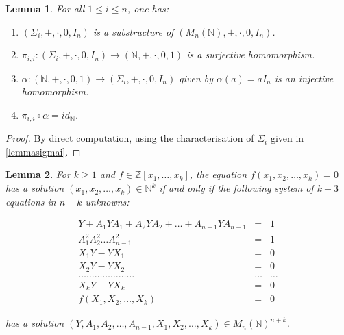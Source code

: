 \documentclass{article}
\theoremstyle{plain}
\newtheorem{lemma}{Lemma}[section]
\theoremstyle{definition}
\begin{document}
\begin{lemma}\label{lemmahomomorphism} For all $1 \leq i \leq n$, one has:
\begin{enumerate}
\item $(\Sigma_i, +, \cdot, 0, I_n)$ is a substructure of $(M_n(\mathbb N), +, \cdot, 0, I_n)$.  
\item $\pi_{i,i} : (\Sigma_i, +, \cdot, 0, I_n) \rightarrow (\mathbb N, +, \cdot, 0, 1)$ is a surjective homomorphism. 
\item $\alpha :  (\mathbb N, +, \cdot, 0, 1) \rightarrow (\Sigma_i, +, \cdot, 0, I_n) $ given by $\alpha(a) = aI_n$ is an injective homomorphism.
\item $\pi_{i,i} \circ \alpha = id_{\mathbb N}$.
\end{enumerate} 
\end{lemma}

\begin{proof} By direct computation, using the characterisation of $\Sigma_i$ given in \cref{lemmasigmai}. \end{proof} 

\begin{lemma}\label{lemmaembedding}
For $k \geq 1$ and $f \in \mathbb Z[x_1, \dots, x_k]$, the equation $f(x_1, x_2, \dots, x_k) = 0$ has a solution  $(x_1, x_2, \dots, x_k) \in \mathbb N^k$ if and only if the following system of $k+3$ equations in $n+k$ unknowns: 

  \begin{eqnarray*}
       Y + A_1YA_1 + A_2YA_2 + \dots + A_{n-1} Y A_{n-1} & = & 1 \\
       A_1^2 A_2^2 \dots A_{n-1}^2 & = & 1 \\
       X_1 Y - Y X_1 &=& 0\\
       X_2 Y - Y X_2 &=& 0\\
      \dots \dots  \dots \dots \dots \dots \dots & \dots & \dots \\
       X_k Y -  Y X_k &=& 0\\
      f(X_1, X_2, \dots, X_k) &= & 0
   \end{eqnarray*} 

has a solution $(Y, A_1, A_2, \dots, A_{n-1}, X_1, X_2, \dots, X_k) \in M_n(\mathbb N)^{n+k}$. 
\end{lemma}
\end{document}
